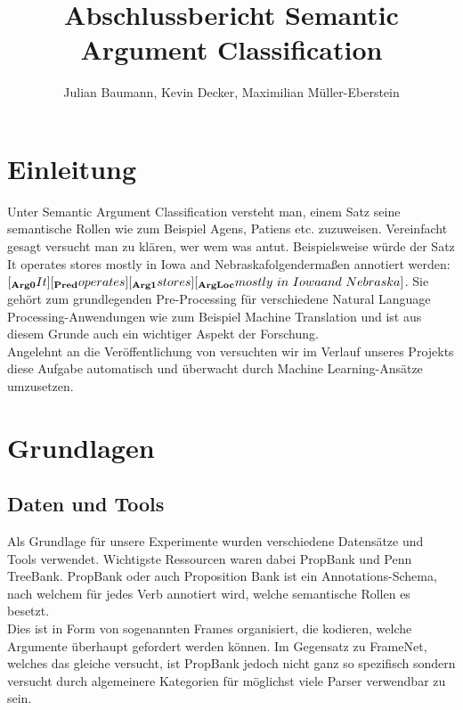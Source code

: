 \documentclass[]{article}
\title{Abschlussbericht Semantic Argument Classification}
\author{Julian Baumann, Kevin Decker, Maximilian Müller-Eberstein}
\begin{document}
\maketitle

\section{Einleitung}
Unter Semantic Argument Classification versteht man, einem Satz seine semantische Rollen wie zum Beispiel Agens, Patiens etc. zuzuweisen. Vereinfacht gesagt versucht man zu klären, \glqq wer wem was antut\grqq. Beispielsweise würde der Satz \glqq It operates stores mostly in Iowa and Nebraska\grqq folgendermaßen annotiert werden: $ [_{\textbf{Arg0}} It][_{\textbf{Pred}} operates][_{\textbf{Arg1}} stores][_{\textbf{ArgLoc}} mostly\ in\ Iowa\\ and\ Nebraska] $. Sie gehört zum grundlegenden Pre-Processing für verschiedene Natural Language Processing-Anwendungen wie zum Beispiel Machine Translation und ist aus diesem Grunde auch ein wichtiger Aspekt der Forschung. \\
Angelehnt an die Veröffentlichung von \cite{Pradhan05supportvector} versuchten wir im Verlauf unseres Projekts diese Aufgabe automatisch und überwacht durch Machine Learning-Ansätze umzusetzen. 

\section{Grundlagen}
\subsection{Daten und Tools}
Als Grundlage für unsere Experimente wurden verschiedene Datensätze und Tools verwendet. Wichtigste Ressourcen waren dabei PropBank und Penn TreeBank. PropBank \cite{Palmer:2005:PBA:1122624.1122628} oder auch Proposition Bank ist ein Annotations-Schema, nach welchem für jedes  Verb annotiert wird, welche semantische Rollen es besetzt. \\ Dies ist in Form von sogenannten Frames organisiert, die kodieren, welche Argumente überhaupt gefordert werden können. Im Gegensatz zu FrameNet, welches das gleiche versucht, ist PropBank jedoch nicht ganz so spezifisch sondern versucht durch algemeinere Kategorien für möglichst viele Parser verwendbar zu sein.\\ 
\end{document}
